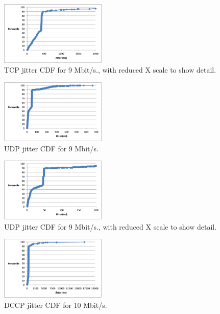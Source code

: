 \begin{figure}[!h]
   \centering
      \includegraphics[width=0.45\textwidth]{pics/tcp_9_jitter_closeup}
   \caption{TCP jitter CDF for 9 Mbit/s., with reduced X scale to show detail.}
\label{fig:tcp_9_jitter_closeup}
\end{figure}

\begin{figure}[!h]
   \centering
      \includegraphics[width=0.45\textwidth]{pics/udp_9_jitter}
   \caption{UDP jitter CDF for 9 Mbit/s.}
\label{fig:udp_9_jitter}
\end{figure}

\begin{figure}[!h]
   \centering
      \includegraphics[width=0.45\textwidth]{pics/udp_9_jitter_closeup}
   \caption{UDP jitter CDF for 9 Mbit/s., with reduced X scale to show detail.}
\label{fig:udp_9_jitter_closeup}
\end{figure}

\begin{figure}[!h]
   \centering
      \includegraphics[width=0.45\textwidth]{pics/dccp_10_jitter_new}
   \caption{DCCP jitter CDF for 10 Mbit/s.}
\label{fig:dccp_10_jitter}
\end{figure}


